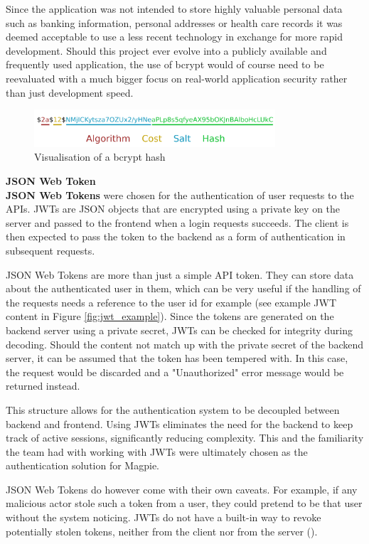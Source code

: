 Since the application was not intended to store highly valuable personal data
such as banking information, personal addresses or health care records it was
deemed acceptable to use a less recent technology in exchange for more rapid
development. Should this project ever evolve into a publicly available and
frequently used application, the use of bcrypt would of course need to be
reevaluated with a much bigger focus on real-world application security rather
than just development speed.

\begin{figure}[H]
  \centering{}
  \includegraphics[width=0.8\textwidth]{./images/bcrypt_hash.png}
  \caption{Visualisation of a bcrypt hash}
  \label{fig:bcrypt_hash}
\end{figure}

\label{jwt}\textbf{JSON Web Token}\\
\textbf{JSON Web Tokens} were chosen for the authentication of user requests to
the APIs. JWTs are JSON objects that are encrypted using a private key on the
server and passed to the frontend when a login requests succeeds. The client is
then expected to pass the token to the backend as a form of authentication in
subsequent requests.

JSON Web Tokens are more than just a simple API token. They can store data about
the authenticated user in them, which can be very useful if the handling of the
requests needs a reference to the user id for example (see example JWT content
in Figure \ref{fig:jwt_example}). Since the tokens are generated on the backend
server using a private secret, JWTs can be checked for integrity during
decoding. Should the content not match up with the private secret of the backend
server, it can be assumed that the token has been tempered with. In this case,
the request would be discarded and a "Unauthorized" error message would be
returned instead.

This structure allows for the authentication system to be decoupled between
backend and frontend. Using JWTs eliminates the need for the backend to keep
track of active sessions, significantly reducing complexity. This and the
familiarity the team had with working with JWTs were ultimately chosen as the
authentication solution for Magpie.

JSON Web Tokens do however come with their own caveats. For example, if any
malicious actor stole such a token from a user, they could pretend to be that
user without the system noticing. JWTs do not have a built-in way to revoke
potentially stolen tokens, neither from the client nor from the server
(\cite{owasp_jwt_cheatsheet}).

